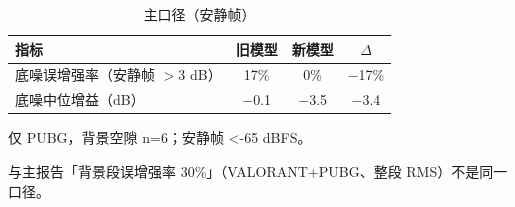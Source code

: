 \begin{table}[htbp]\centering
\caption{主口径（安静帧）}\label{tab:nm_bg_summary}
{\small\begin{threeparttable}
\begin{tabularx}{\linewidth}{Lccc}\toprule
指标 & 旧模型 & 新模型 & $\Delta$ \\
\midrule
底噪误增强率（安静帧 $>$3 dB） & 17\% & 0\% & $-$17\% \\
底噪中位增益（dB） & $-$0.1 & $-$3.5 & $-$3.4 \\
\bottomrule\end{tabularx}
\begin{tablenotes}\footnotesize\item 仅 PUBG，背景空隙 n=6；安静帧 <-65 dBFS。\item 与主报告「背景段误增强率 30\%」（VALORANT+PUBG、整段 RMS）不是同一口径。\end{tablenotes}\end{threeparttable}}
\end{table}
